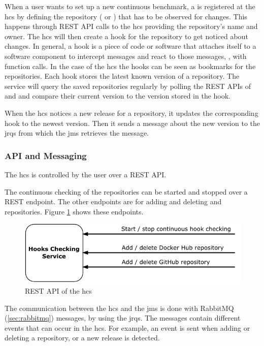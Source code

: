 When a user wants to set up a new continuous benchmark, a \ts{} is registered at the \ac{hcs} by defining the repository (\gh{} or \dockh{}) that has to be observed for changes.
This happens through REST API calls to the \ac{hcs} providing the repository's name and owner.
The \ac{hcs} will then create a hook for the repository to get noticed about changes.
In general, a hook is a piece of code or software that attaches itself to a software component to intercept messages and react to those messages, \eg, with function calls.
In the case of the \ac{hcs} the hooks can be seen as bookmarks for the repositories.
Each hook stores the latest known version of a repository.
The service will query the saved repositories regularly by polling the REST APIs of \gh{} and \dockh{} and compare their current version to the version stored in the hook.

When the \ac{hcs} notices a new release for a repository, it updates the corresponding hook to the newest version.
Then it sends a message about the new version to the \aclp{jrq} from which the \acl{jms} retrieves the message.

\subsubsection{API and Messaging}
\label{sec:hooks_api}
The \ac{hcs} is controlled by the user over a REST API.

The continuous checking of the repositories can be started and stopped over a REST endpoint.
The other endpoints are for adding and deleting \gh{} and \dockh{} repositories.
Figure \ref{fig:rest_apis_approach_hcs} shows these endpoints.
\begin{figure}[tbph]
	\centering
	\includegraphics[width=.57\textwidth]{figures/rest-apis-approach-hcs.pdf}
	\caption{REST API of the \acl{hcs}}
	\label{fig:rest_apis_approach_hcs}
\end{figure}

The communication between the \ac{hcs} and the \acl{jms} is done with RabbitMQ (\ref{sec:rabbitmq}) messages, by using the \aclp{jrq}.
The messages contain different events that can occur in the \ac{hcs}.
For example, an event is sent when adding or deleting a repository, or a new release is detected.



